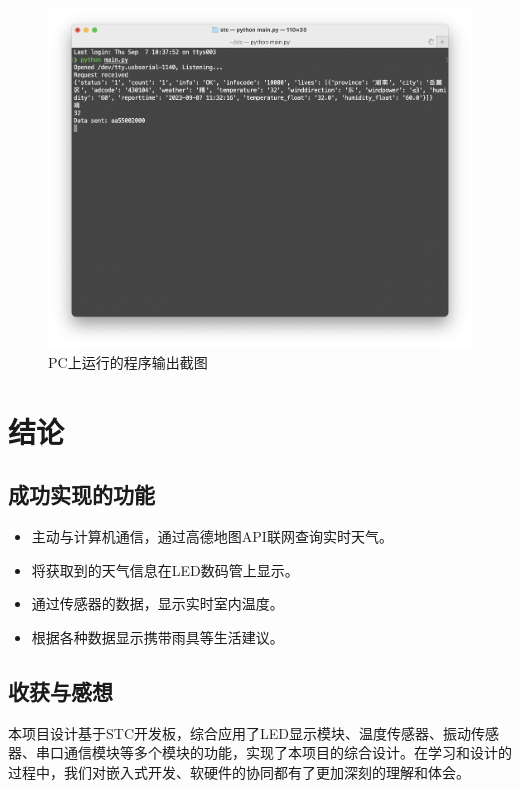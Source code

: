 \documentclass{article}
\begin{document}
\begin{figure}[h]
    \centering
    \includegraphics[width=1\textwidth]{test_screenshot.png}
    \caption{PC上运行的程序输出截图}
    \label{fig:test_screenshot}
\end{figure}

\section{结论}

\subsection{成功实现的功能}

\begin{itemize}
  \item 主动与计算机通信，通过高德地图API联网查询实时天气。
  \item 将获取到的天气信息在LED数码管上显示。
  \item 通过传感器的数据，显示实时室内温度。
  \item 根据各种数据显示携带雨具等生活建议。
\end{itemize}

\subsection{收获与感想}

本项目设计基于STC开发板，综合应用了LED显示模块、温度传感器、振动传感器、串口通信模块等多个模块的功能，实现了本项目的综合设计。在学习和设计的过程中，我们对嵌入式开发、软硬件的协同都有了更加深刻的理解和体会。
\end{document}

